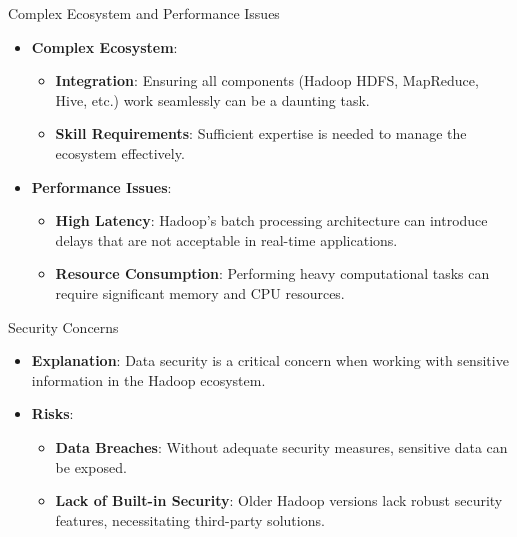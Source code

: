 \documentclass[aspectratio=169]{beamer}
\begin{document}
\begin{frame}[fragile]{Complex Ecosystem and Performance Issues}
    \begin{itemize}
        \item \textbf{Complex Ecosystem}:
        \begin{itemize}
            \item \textbf{Integration}: Ensuring all components (Hadoop HDFS, MapReduce, Hive, etc.) work seamlessly can be a daunting task.
            \item \textbf{Skill Requirements}: Sufficient expertise is needed to manage the ecosystem effectively.
        \end{itemize}
        
        \item \textbf{Performance Issues}:
        \begin{itemize}
            \item \textbf{High Latency}: Hadoop's batch processing architecture can introduce delays that are not acceptable in real-time applications.
            \item \textbf{Resource Consumption}: Performing heavy computational tasks can require significant memory and CPU resources.
        \end{itemize}
    \end{itemize}
\end{frame}

\begin{frame}[fragile]{Security Concerns}
    \begin{itemize}
        \item \textbf{Explanation}: Data security is a critical concern when working with sensitive information in the Hadoop ecosystem.
        \item \textbf{Risks}:
        \begin{itemize}
            \item \textbf{Data Breaches}: Without adequate security measures, sensitive data can be exposed.
            \item \textbf{Lack of Built-in Security}: Older Hadoop versions lack robust security features, necessitating third-party solutions.
        \end{itemize}
    \end{itemize}
\end{frame}
\end{document}
